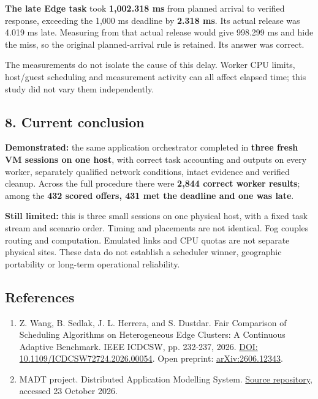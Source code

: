 \documentclass[11pt,a4paper]{article}
\begin{document}
\textbf{The late Edge task} took \textbf{1,002.318 ms} from planned
arrival to verified response, exceeding the 1,000 ms deadline by
\textbf{2.318 ms}. Its actual release was 4.019 ms late. Measuring from
that actual release would give 998.299 ms and hide the miss, so the
original planned-arrival rule is retained. Its answer was correct.

The measurements do not isolate the cause of this delay. Worker CPU
limits, host/guest scheduling and measurement activity can all affect
elapsed time; this study did not vary them independently.

\Needspace{260pt}

\subsection{8. Current conclusion}\label{current-conclusion}

\textbf{Demonstrated:} the same application orchestrator completed in
\textbf{three fresh VM sessions on one host}, with correct task
accounting and outputs on every worker, separately qualified network
conditions, intact evidence and verified cleanup. Across the full
procedure there were \textbf{2,844 correct worker results}; among the
\textbf{432 scored offers, 431 met the deadline and one was late}.

\textbf{Still limited:} this is three small sessions on one physical
host, with a fixed task stream and scenario order. Timing and placements
are not identical. Fog couples routing and computation. Emulated links
and CPU quotas are not separate physical sites. These data do not
establish a scheduler winner, geographic portability or long-term
operational reliability.

\subsection{References}\label{references}

\begin{enumerate}
\def\labelenumi{\arabic{enumi}.}
\tightlist
\item
  Z. Wang, B. Sedlak, J. L. Herrera, and S. Dustdar.
  \textquotesingle Fair Comparison of Scheduling Algorithms on
  Heterogeneous Edge Clusters: A Continuous Adaptive
  Benchmark.\textquotesingle{} IEEE ICDCSW, pp. 232-237, 2026.
  \href{https://doi.org/10.1109/ICDCSW72724.2026.00054}{DOI:
  10.1109/ICDCSW72724.2026.00054}. Open preprint:
  \href{https://arxiv.org/abs/2606.12343}{arXiv:2606.12343}.
\item
  MADT project. \textquotesingle Distributed Application Modelling
  System.\textquotesingle{}
  \href{https://github.com/dltcspbu/madt}{Source repository}, accessed
  23 October 2026.
\end{enumerate}
\end{document}

